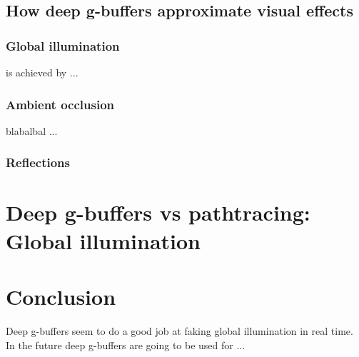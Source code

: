\documentclass{ACGSeminar}
\begin{document}
	\subsection{How deep g-buffers approximate visual effects}
	\subsubsection{Global illumination} 
		is achieved by ... \cite{RAD}
	\subsubsection{Ambient occlusion}
		blabalbal ...
	\subsubsection{Reflections}

\section{Deep g-buffers vs pathtracing: Global illumination}
\section{Conclusion}
	Deep g-buffers seem to do a good job at faking global illumination in real time. In the future deep g-buffers are going to be used for ...

\printbibliography
\end{document}
